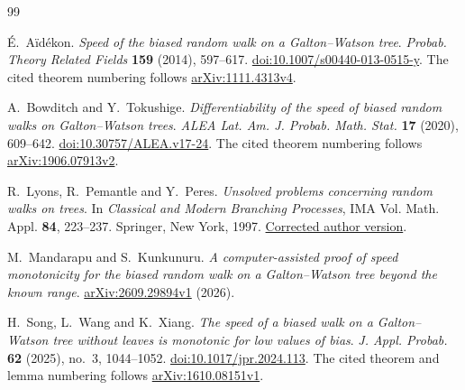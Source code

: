 \documentclass[11pt,reqno]{amsart}
\theoremstyle{plain}
\theoremstyle{definition}
\theoremstyle{remark}
\numberwithin{equation}{section}
\begin{document}
\begin{thebibliography}{99}

\'{E}.~A\"id\'ekon.
\emph{Speed of the biased random walk on a Galton--Watson tree}.
\emph{Probab. Theory Related Fields} \textbf{159} (2014), 597--617.
\href{https://doi.org/10.1007/s00440-013-0515-y}{doi:10.1007/s00440-013-0515-y}.
The cited theorem numbering follows
\href{https://arxiv.org/abs/1111.4313v4}{arXiv:1111.4313v4}.

A.~Bowditch and Y.~Tokushige.
\emph{Differentiability of the speed of biased random walks on
Galton--Watson trees}.
\emph{ALEA Lat. Am. J. Probab. Math. Stat.} \textbf{17} (2020), 609--642.
\href{https://doi.org/10.30757/ALEA.v17-24}{doi:10.30757/ALEA.v17-24}.
The cited theorem numbering follows
\href{https://arxiv.org/abs/1906.07913v2}{arXiv:1906.07913v2}.

R.~Lyons, R.~Pemantle and Y.~Peres.
\emph{Unsolved problems concerning random walks on trees}.
In \emph{Classical and Modern Branching Processes},
IMA Vol. Math. Appl. \textbf{84}, 223--237.
Springer, New York, 1997.
\href{https://rdlyons.pages.iu.edu/pdf/opentree7.pdf}{Corrected author version}.

M.~Mandarapu and S.~Kunkunuru.
\emph{A computer-assisted proof of speed monotonicity for the biased
random walk on a Galton--Watson tree beyond the known range}.
\href{https://arxiv.org/abs/2609.29894v1}{arXiv:2609.29894v1} (2026).

H.~Song, L.~Wang and K.~Xiang.
\emph{The speed of a biased walk on a Galton--Watson tree without leaves
is monotonic for low values of bias}.
\emph{J. Appl. Probab.} \textbf{62} (2025), no.~3, 1044--1052.
\href{https://doi.org/10.1017/jpr.2024.113}{doi:10.1017/jpr.2024.113}.
The cited theorem and lemma numbering follows
\href{https://arxiv.org/abs/1610.08151v1}{arXiv:1610.08151v1}.

\end{thebibliography}
\end{document}
